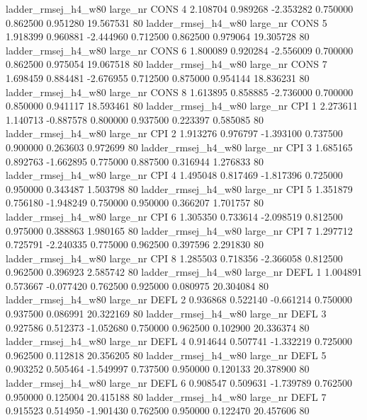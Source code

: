ladder_rmsej_h4_w80   large_nr     CONS                 4  2.108704  0.989268  -2.353282 0.750000 0.862500  0.951280   19.567531 80
ladder_rmsej_h4_w80   large_nr     CONS                 5  1.918399  0.960881  -2.444960 0.712500 0.862500  0.979064   19.305728 80
ladder_rmsej_h4_w80   large_nr     CONS                 6  1.800089  0.920284  -2.556009 0.700000 0.862500  0.975054   19.067518 80
ladder_rmsej_h4_w80   large_nr     CONS                 7  1.698459  0.884481  -2.676955 0.712500 0.875000  0.954144   18.836231 80
ladder_rmsej_h4_w80   large_nr     CONS                 8  1.613895  0.858885  -2.736000 0.700000 0.850000  0.941117   18.593461 80
ladder_rmsej_h4_w80   large_nr      CPI                 1  2.273611  1.140713  -0.887578 0.800000 0.937500  0.223397    0.585085 80
ladder_rmsej_h4_w80   large_nr      CPI                 2  1.913276  0.976797  -1.393100 0.737500 0.900000  0.263603    0.972699 80
ladder_rmsej_h4_w80   large_nr      CPI                 3  1.685165  0.892763  -1.662895 0.775000 0.887500  0.316944    1.276833 80
ladder_rmsej_h4_w80   large_nr      CPI                 4  1.495048  0.817469  -1.817396 0.725000 0.950000  0.343487    1.503798 80
ladder_rmsej_h4_w80   large_nr      CPI                 5  1.351879  0.756180  -1.948249 0.750000 0.950000  0.366207    1.701757 80
ladder_rmsej_h4_w80   large_nr      CPI                 6  1.305350  0.733614  -2.098519 0.812500 0.975000  0.388863    1.980165 80
ladder_rmsej_h4_w80   large_nr      CPI                 7  1.297712  0.725791  -2.240335 0.775000 0.962500  0.397596    2.291830 80
ladder_rmsej_h4_w80   large_nr      CPI                 8  1.285503  0.718356  -2.366058 0.812500 0.962500  0.396923    2.585742 80
ladder_rmsej_h4_w80   large_nr     DEFL                 1  1.004891  0.573667  -0.077420 0.762500 0.925000  0.080975   20.304084 80
ladder_rmsej_h4_w80   large_nr     DEFL                 2  0.936868  0.522140  -0.661214 0.750000 0.937500  0.086991   20.322169 80
ladder_rmsej_h4_w80   large_nr     DEFL                 3  0.927586  0.512373  -1.052680 0.750000 0.962500  0.102900   20.336374 80
ladder_rmsej_h4_w80   large_nr     DEFL                 4  0.914644  0.507741  -1.332219 0.725000 0.962500  0.112818   20.356205 80
ladder_rmsej_h4_w80   large_nr     DEFL                 5  0.903252  0.505464  -1.549997 0.737500 0.950000  0.120133   20.378900 80
ladder_rmsej_h4_w80   large_nr     DEFL                 6  0.908547  0.509631  -1.739789 0.762500 0.950000  0.125004   20.415188 80
ladder_rmsej_h4_w80   large_nr     DEFL                 7  0.915523  0.514950  -1.901430 0.762500 0.950000  0.122470   20.457606 80
